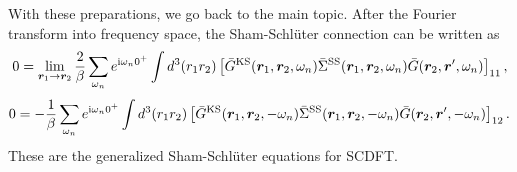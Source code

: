 With these preparations, we go back to the main topic. After the Fourier transform into frequency space,
the Sham-Schl\"{u}ter connection can be written as
%
\begin{equation}
	0 = \lim_{\bm r_1 \to \bm r_2} \frac{2}{\beta} \sum_{\omega_n}
	e^{ {\rm i}\omega_n 0^{+}} 
	\int d^3(r_1 r_2) \left[ \bar{G}^{\rm KS}(\bm r_1, \bm r_2, \omega_n)
	\bar{\Sigma }^{\rm SS}(\bm r_1, \bm r_2, \omega_n) \bar{G}(\bm r_2, \bm r', \omega_n)
	\right]_{11},
	\label{eq:AppSSrho}
\end{equation}
%
\begin{equation}
	0 = - \frac{1}{\beta} \sum_{\omega_n}
	e^{ {\rm i}\omega_n 0^{+}} 
	\int d^3(r_1 r_2) \left[ \bar{G}^{\rm KS}(\bm r_1, \bm r_2, -\omega_n)
	\bar{\Sigma }^{\rm SS}(\bm r_1, \bm r_2, -\omega_n) \bar{G}(\bm r_2, \bm r', -\omega_n)
	\right]_{12}.
	\label{eq:AppSSanom}
\end{equation}
%
These are the generalized Sham-Schl\"{u}ter equations for SCDFT.

